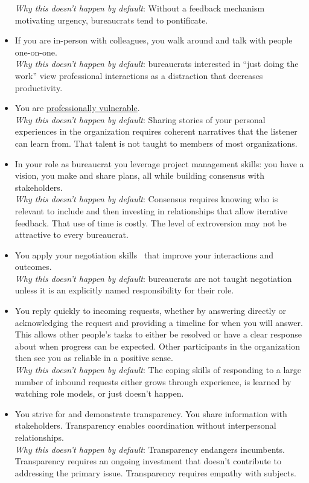 \begin{itemize}
    \textit{Why this doesn't happen by default}: Without a feedback mechanism motivating urgency, bureaucrats tend to pontificate. 
    \item If you are in-person with colleagues, you walk around and talk with people one-on-one.  \\
    \textit{Why this doesn't happen by default}: bureaucrats interested in ``just doing the work'' view professional interactions as a distraction that decreases productivity. 
    \item You are 
%
    \hyperref[sec:professional-vulnerability]{professionally vulnerable}. \\
    \textit{Why this doesn't happen by default}: Sharing stories of your personal experiences in the organization requires coherent narratives that the listener can learn from. That talent is not taught to members of most organizations. 
    \item In your role as bureaucrat you leverage project management skills: you have a vision, you make and share plans, all while building consensus with stakeholders. \\
    \textit{Why this doesn't happen by default}: Consensus requires knowing who is relevant to include and then investing in relationships that allow iterative feedback. That use of time is costly. The level of extroversion may not be attractive to every bureaucrat.
    \item You apply your negotiation skills~\cite{1982_Cohen} that improve your interactions and outcomes.\\
    \textit{Why this doesn't happen by default}: bureaucrats are not taught negotiation unless it is an explicitly named responsibility for their role. 
    \item You reply quickly to incoming requests, whether by answering directly or acknowledging the request and providing a timeline for when you will answer. This allows other people's tasks to either be resolved or have a clear response about when progress can be expected. Other participants in the organization then see you as reliable in a positive sense.\\
    \textit{Why this doesn't happen by default}: The coping skills of responding to a large number of inbound requests either grows through experience, is learned by watching role models, or just doesn't happen.
    \item You strive for and demonstrate transparency. You share information with stakeholders. Transparency  enables coordination without interpersonal relationships.\\
    \textit{Why this doesn't happen by default}: Transparency endangers incumbents. Transparency requires an ongoing investment that doesn't contribute to addressing the primary issue. Transparency requires empathy with subjects.
\end{itemize}

